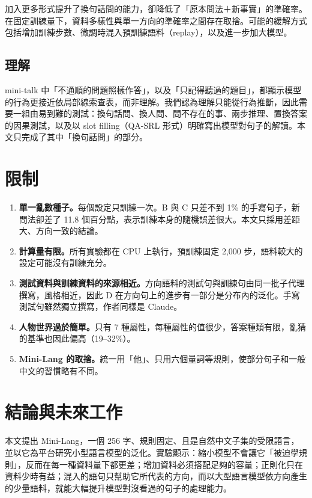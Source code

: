 \documentclass[11pt,a4paper]{article}
\begin{document}
加入更多形式提升了換句話問的能力，卻降低了「原本問法＋新事實」的準確率。在固定訓練量下，資料多樣性與單一方向的準確率之間存在取捨。可能的緩解方式包括增加訓練步數、微調時混入預訓練語料（replay），以及進一步加大模型。

\subsection{理解}

mini-talk 中「不通順的問題照樣作答」，以及「只記得聽過的題目」，都顯示模型的行為更接近依局部線索查表，而非理解。我們認為理解只能從行為推斷，因此需要一組由易到難的測試：換句話問、換人問、問不存在的事、兩步推理、置換答案的因果測試，以及以 slot filling（QA-SRL \cite{he2015qasrl} 形式）明確寫出模型對句子的解讀。本文只完成了其中「換句話問」的部分。

\section{限制}

\begin{enumerate}
  \item \textbf{單一亂數種子。}每個設定只訓練一次。B 與 C 只差不到 1\% 的手寫句子，新問法卻差了 11.8 個百分點，表示訓練本身的隨機誤差很大。本文只採用差距大、方向一致的結論。
  \item \textbf{計算量有限。}所有實驗都在 CPU 上執行，預訓練固定 2,000 步，語料較大的設定可能沒有訓練充分。
  \item \textbf{測試資料與訓練資料的來源相近。}方向語料的測試句與訓練句由同一批子代理撰寫，風格相近，因此 D 在方向句上的進步有一部分是分布內的泛化。手寫測試句雖然獨立撰寫，作者同樣是 Claude。
  \item \textbf{人物世界過於簡單。}只有 7 種屬性，每種屬性的值很少，答案種類有限，亂猜的基準也因此偏高（19--32\%）。
  \item \textbf{Mini-Lang 的取捨。}統一用「他」、只用六個量詞等規則，使部分句子和一般中文的習慣略有不同。
\end{enumerate}

\section{結論與未來工作}

本文提出 Mini-Lang，一個 256 字、規則固定、且是自然中文子集的受限語言，並以它為平台研究小型語言模型的泛化。實驗顯示：縮小模型不會讓它「被迫學規則」，反而在每一種資料量下都更差；增加資料必須搭配足夠的容量；正則化只在資料少時有益；混入的語句只幫助它所代表的方向，而以大型語言模型依方向產生的少量語料，就能大幅提升模型對沒看過的句子的處理能力。
\end{document}
